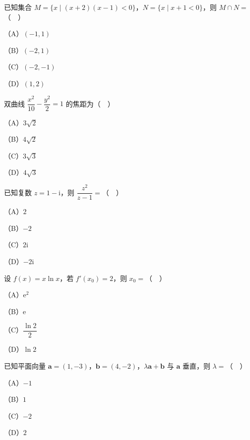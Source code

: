 


\begin{question}
已知集合 $M=\{x\mid(x+2)(x-1)<0\}$，$N=\{x\mid x+1<0\}$，则 $M\cap N=$（　）

（A）$(-1,1)$

（B）$(-2,1)$

（C）$(-2,-1)$

（D）$(1,2)$

\end{question}
\begin{question}
双曲线 $\dfrac{x^2}{10}-\dfrac{y^2}{2}=1$ 的焦距为（　）

（A）$3\sqrt2$

（B）$4\sqrt2$

（C）$3\sqrt3$

（D）$4\sqrt3$

\end{question}
\begin{question}
已知复数 $z=1-\mathrm i$，则 $\dfrac{z^2}{z-1}=$（　）

（A）$2$

（B）$-2$

（C）$2\mathrm i$

（D）$-2\mathrm i$

\end{question}
\begin{question}
设 $f(x)=x\ln x$，若 $f'(x_0)=2$，则 $x_0=$（　）

（A）$\mathrm e^2$

（B）$\mathrm e$

（C）$\dfrac{\ln2}2$

（D）$\ln2$

\end{question}
\begin{question}
已知平面向量 $\boldsymbol a=(1,-3)$，$\boldsymbol b=(4,-2)$，$\lambda\boldsymbol a+\boldsymbol b$ 与 $\boldsymbol a$ 垂直，则 $\lambda=$（　）

（A）$-1$

（B）$1$

（C）$-2$

（D）$2$

\Needspace{0.4\textheight}
\end{question}
